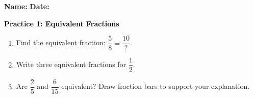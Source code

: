 \documentclass[12pt, letterpaper, fleqn]{article}
\begin{document}
\textbf{Name:} \underline{\hspace{5cm}}
\hfill
\textbf{Date:} \underline{\hspace{3cm}}\\

\begin{tcolorbox}[colback=customteal!20]
    \large\textcolor{black}{\textbf{Practice 1: Equivalent Fractions}}
\end{tcolorbox}
\begin{enumerate}[itemsep=3.5cm, leftmargin=0.6cm]
\item Find the equivalent fraction: $\dfrac{5}{8} = \dfrac{10}{\text{?}}$.
\vspace{3.5cm}
\item Write three equivalent fractions for $\dfrac{1}{2}$.
\vspace{3.5cm}
\item Are $\dfrac{2}{5}$ and $\dfrac{6}{15}$ equivalent? Draw fraction bars to support your explanation.
\end{enumerate}
\end{document}

